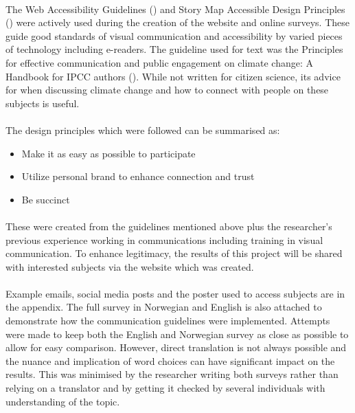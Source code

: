 \paragraph{}

The Web Accessibility Guidelines (\cite{henry_web_2022}) and Story Map Accessible Design Principles (\cite{todd_liz_getting_nodate}) were actively used during the creation of the website and online surveys. These guide good standards of visual communication and accessibility by varied pieces of technology including e-readers. The guideline used for text was the Principles for effective communication and public engagement on	climate change: A Handbook for IPCC authors (\cite{corner_a_principles_2018}). While not written for citizen science, its advice for when discussing climate change and how to connect with people on these subjects is useful. 
\paragraph{}

The design principles which were followed can be summarised as:
\begin{itemize}
    \item Make it as easy as possible to participate
    \item Utilize personal brand to enhance connection and trust
    \item Be succinct
\end{itemize}
\paragraph{}
These were created from the guidelines mentioned above plus the researcher's previous experience working in communications including training in visual communication. To enhance legitimacy, the results of this project will be shared with interested subjects via the website which was created.
\paragraph{}
Example emails, social media posts and the poster used to access subjects are in the appendix. The full survey in Norwegian and English is also attached to demonstrate how the communication guidelines were implemented. Attempts were made to keep both the English and Norwegian survey as close as possible to allow for easy comparison. However, direct translation is not always possible and the nuance and implication of word choices can have significant impact on the results. This was minimised by the researcher writing both surveys rather than relying on a translator and by getting it checked by several individuals with understanding of the topic.

